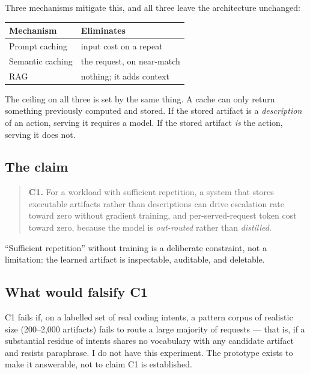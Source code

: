 \documentclass[11pt,twocolumn]{article}
\begin{document}
Three mechanisms mitigate this, and all three leave the architecture unchanged:

\begin{center}
\small
\begin{tabular}{@{}ll@{}}
\toprule
\textbf{Mechanism} & \textbf{Eliminates} \\
\midrule
Prompt caching & input cost on a repeat \\
Semantic caching & the request, on near-match \\
RAG & nothing; it adds context \\
\bottomrule
\end{tabular}
\normalsize
\end{center}

The ceiling on all three is set by the same thing. A cache can only return
something previously computed and stored. If the stored artifact is a
\emph{description} of an action, serving it requires a model. If the stored
artifact \emph{is} the action, serving it does not.

\subsection{The claim}

\begin{quote}
\textbf{C1.} For a workload with sufficient repetition, a system that stores
executable artifacts rather than descriptions can drive escalation rate toward
zero without gradient training, and per-served-request token cost toward zero,
because the model is \emph{out-routed} rather than \emph{distilled}.
\end{quote}

``Sufficient repetition'' without training is a deliberate constraint, not a
limitation: the learned artifact is inspectable, auditable, and deletable.

\subsection{What would falsify C1}

C1 fails if, on a labelled set of real coding intents, a pattern corpus of
realistic size (200--2{,}000 artifacts) fails to route a large majority of
requests --- that is, if a substantial residue of intents shares no vocabulary
with any candidate artifact and resists paraphrase. I do not have this
experiment. The prototype exists to make it answerable, not to claim C1 is
established.
\end{document}
